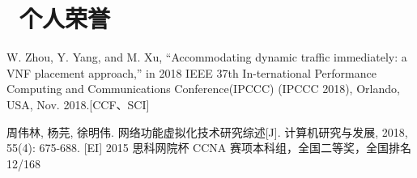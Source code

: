 \documentclass{resume}
\begin{document}
\section{\faHeartO\ 个人荣誉}

{ W. Zhou,  Y.  Yang, and M. Xu, “Accommodating  dynamic  traffic immediately:  a VNF placement approach,” in 2018 IEEE 37th In-ternational Performance Computing and Communications Conference(IPCCC) (IPCCC 2018), Orlando, USA, Nov. 2018.[CCF、SCI]}

{ 周伟林, 杨芫, 徐明伟. 网络功能虚拟化技术研究综述[J]. 计算机研究与发展, 2018, 55(4): 675-688. [EI]}
{2015 思科网院杯 CCNA 赛项本科组，全国二等奖，全国排名 12/168}
\end{document}
